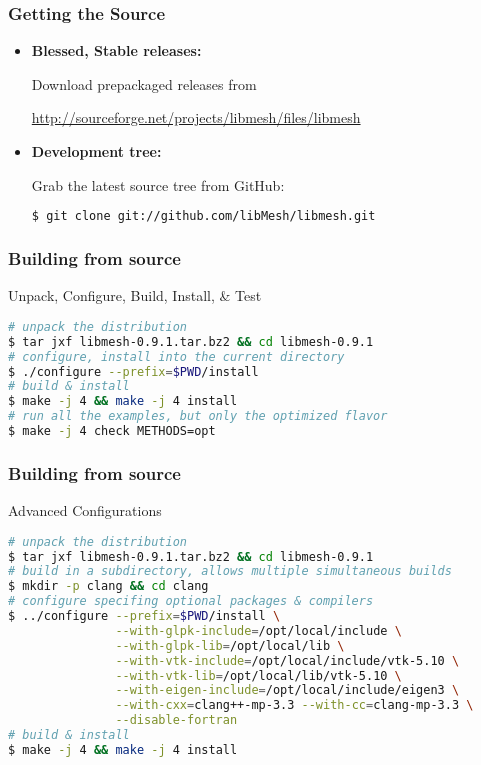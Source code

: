 \begin{frame}[fragile]
  \frametitle{Getting the \libMesh{} Source}

  \begin{block}{}
    \begin{itemize}
    \item \textbf{Blessed, Stable releases:}

      Download prepackaged releases from

      \scriptsize{\url{http://sourceforge.net/projects/libmesh/files/libmesh}}
      \normalsize
    \item \textbf{Development tree:}

      Grab the latest source tree from GitHub:
      \begin{lstlisting}[language=bash]
$ git clone git://github.com/libMesh/libmesh.git
      \end{lstlisting}
    \end{itemize}
  \end{block}
\end{frame}


\begin{frame}[fragile]
  \frametitle{Building \libMesh{} from source}

  \begin{block}{Unpack, Configure, Build, Install, \& Test}
    \begin{lstlisting}[language=bash]
# unpack the distribution
$ tar jxf libmesh-0.9.1.tar.bz2 && cd libmesh-0.9.1
# configure, install into the current directory
$ ./configure --prefix=$PWD/install
# build & install
$ make -j 4 && make -j 4 install
# run all the examples, but only the optimized flavor
$ make -j 4 check METHODS=opt
    \end{lstlisting}
  \end{block}
\end{frame}



\begin{frame}[fragile]
  \frametitle{Building \libMesh{} from source}

  \begin{block}{Advanced Configurations}
    \begin{lstlisting}[language=bash]
# unpack the distribution
$ tar jxf libmesh-0.9.1.tar.bz2 && cd libmesh-0.9.1
# build in a subdirectory, allows multiple simultaneous builds
$ mkdir -p clang && cd clang
# configure specifing optional packages & compilers
$ ../configure --prefix=$PWD/install \
               --with-glpk-include=/opt/local/include \
               --with-glpk-lib=/opt/local/lib \
               --with-vtk-include=/opt/local/include/vtk-5.10 \
               --with-vtk-lib=/opt/local/lib/vtk-5.10 \
               --with-eigen-include=/opt/local/include/eigen3 \
               --with-cxx=clang++-mp-3.3 --with-cc=clang-mp-3.3 \
               --disable-fortran
# build & install
$ make -j 4 && make -j 4 install
    \end{lstlisting}
  \end{block}
\end{frame}



